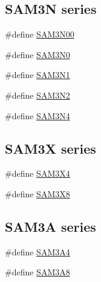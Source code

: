 \subsection*{S\+A\+M3N series}
\begin{DoxyCompactItemize}
\item 
\#define \mbox{\hyperlink{group__sam__part__macros__group_gab650d285e2a8ff0d85b3522c87a4cfc6}{S\+A\+M3\+N00}}
\item 
\#define \mbox{\hyperlink{group__sam__part__macros__group_ga6a5ed34ed428558ee2bb94af5ae516d6}{S\+A\+M3\+N0}}
\item 
\#define \mbox{\hyperlink{group__sam__part__macros__group_gaf58a7d141f31d6db97223dfd62d92905}{S\+A\+M3\+N1}}
\item 
\#define \mbox{\hyperlink{group__sam__part__macros__group_ga96514eddac4935925994ef85ca9d12ac}{S\+A\+M3\+N2}}
\item 
\#define \mbox{\hyperlink{group__sam__part__macros__group_ga1d47bffd90ddbb0dac3874edbafb3803}{S\+A\+M3\+N4}}
\end{DoxyCompactItemize}
\subsection*{S\+A\+M3X series}
\begin{DoxyCompactItemize}
\item 
\#define \mbox{\hyperlink{group__sam__part__macros__group_ga735357bdbbd05356a7829e517fb4203f}{S\+A\+M3\+X4}}
\item 
\#define \mbox{\hyperlink{group__sam__part__macros__group_ga13be8353e38999aaca5c412c895c15da}{S\+A\+M3\+X8}}
\end{DoxyCompactItemize}
\subsection*{S\+A\+M3A series}
\begin{DoxyCompactItemize}
\item 
\#define \mbox{\hyperlink{group__sam__part__macros__group_ga1f4481b0cd1b2c1a4636999b6a433b9f}{S\+A\+M3\+A4}}
\item 
\#define \mbox{\hyperlink{group__sam__part__macros__group_gab1397a5e346af96e5ed34027ed3b4de8}{S\+A\+M3\+A8}}
\end{DoxyCompactItemize}
